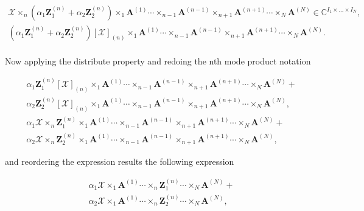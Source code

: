 \documentclass[a4paper,10pt]{article}
\begin{document}
\begin{enumerate}
\begin{enumerate}
                \begin{align*}
                    \mathcal{X} \times_{n} (\alpha_{1} \boldsymbol{Z}^{(n)}_{1} + \alpha_{2} \boldsymbol{Z}^{(n)}_{2}) \times_{1} \boldsymbol{A}^{(1)} \cdots  \times_{n-1} \boldsymbol{A}^{(n-1)} \times_{n+1} \boldsymbol{A}^{(n+1)} \cdots \times_{N} \boldsymbol{A}^{(N)} \in \mathbb{C}^{I_{1} \times ... \times I_{N}}, \\
                    (\alpha_{1} \boldsymbol{Z}^{(n)}_{1} + \alpha_{2} \boldsymbol{Z}^{(n)}_{2}) \left[\mathcal{X}\right]_{(n)} \times_{1} \boldsymbol{A}^{(1)} \cdots  \times_{n-1} \boldsymbol{A}^{(n-1)} \times_{n+1} \boldsymbol{A}^{(n+1)} \cdots \times_{N} \boldsymbol{A}^{(N)}.
                \end{align*}
                
                \paragraph{}Now applying the distribute property and redoing the nth mode product notation
                
                \begin{align*}
                    &\alpha_{1} \boldsymbol{Z}^{(n)}_{1} \left[\mathcal{X}\right]_{(n)} \times_{1} \boldsymbol{A}^{(1)}  \cdots  \times_{n-1} \boldsymbol{A}^{(n-1)} \times_{n+1} \boldsymbol{A}^{(n+1)} \cdots \times_{N} \boldsymbol{A}^{(N)} + \\
                    &\alpha_{2} \boldsymbol{Z}^{(n)}_{2} \left[\mathcal{X}\right]_{(n)} \times_{1} \boldsymbol{A}^{(1)} \cdots  \times_{n-1} \boldsymbol{A}^{(n-1)} \times_{n+1} \boldsymbol{A}^{(n+1)} \cdots \times_{N} \boldsymbol{A}^{(N)}, \\
                    &\alpha_{1} \mathcal{X} \times_{n} \boldsymbol{Z}^{(n)}_{1} \times_{1} \boldsymbol{A}^{(1)} \cdots  \times_{n-1} \boldsymbol{A}^{(n-1)} \times_{n+1} \boldsymbol{A}^{(n+1)} \cdots \times_{N} \boldsymbol{A}^{(N)} + \\
                    &\alpha_{2} \mathcal{X} \times_{n} \boldsymbol{Z}^{(n)}_{2} \times_{1} \boldsymbol{A}^{(1)} \cdots  \times_{n-1} \boldsymbol{A}^{(n-1)} \times_{n+1} \boldsymbol{A}^{(n+1)} \cdots \times_{N} \boldsymbol{A}^{(N)},
                \end{align*}
                
                and reordering the expression results the following expression
                
                \begin{align*}
                    &\alpha_{1} \mathcal{X}  \times_{1} \boldsymbol{A}^{(1)} \cdots \times_{n} \boldsymbol{Z}^{(n)}_{1} \cdots \times_{N} \boldsymbol{A}^{(N)} + \\
                    &\alpha_{2} \mathcal{X}  \times_{1} \boldsymbol{A}^{(1)} \cdots \times_{n} \boldsymbol{Z}^{(n)}_{2} \cdots \times_{N} \boldsymbol{A}^{(N)},
                \end{align*}
                

\end{enumerate}
\end{enumerate}
\end{document}
